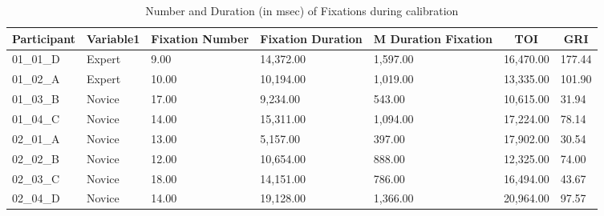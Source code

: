 \documentclass[
  english,
  man,floatsintext]{apa6}
\begin{document}
\begin{table}[h]

\begin{center}
\begin{threeparttable}

\caption{\label{tab:calibration phase TOI}Number and Duration (in msec) of Fixations during calibration}

\scriptsize{

\begin{tabular}{lllllll}
\toprule
Participant & \multicolumn{1}{c}{Variable1} & \multicolumn{1}{c}{Fixation Number} & \multicolumn{1}{c}{Fixation Duration} & \multicolumn{1}{c}{M Duration Fixation} & \multicolumn{1}{c}{TOI} & \multicolumn{1}{c}{GRI}\\
\midrule
01\_01\_D & Expert & 9.00 & 14,372.00 & 1,597.00 & 16,470.00 & 177.44\\
01\_02\_A & Expert & 10.00 & 10,194.00 & 1,019.00 & 13,335.00 & 101.90\\
01\_03\_B & Novice & 17.00 & 9,234.00 & 543.00 & 10,615.00 & 31.94\\
01\_04\_C & Novice & 14.00 & 15,311.00 & 1,094.00 & 17,224.00 & 78.14\\
02\_01\_A & Novice & 13.00 & 5,157.00 & 397.00 & 17,902.00 & 30.54\\
02\_02\_B & Novice & 12.00 & 10,654.00 & 888.00 & 12,325.00 & 74.00\\
02\_03\_C & Novice & 18.00 & 14,151.00 & 786.00 & 16,494.00 & 43.67\\
02\_04\_D & Novice & 14.00 & 19,128.00 & 1,366.00 & 20,964.00 & 97.57\\
\bottomrule
\end{tabular}

}

\end{threeparttable}
\end{center}

\end{table}
\end{document}
